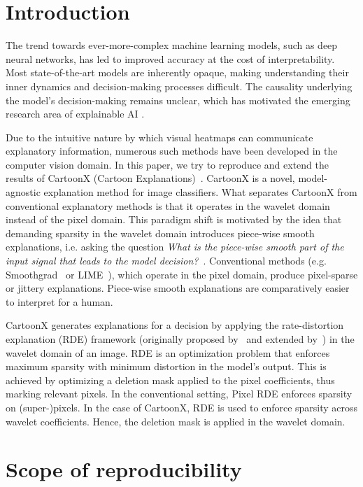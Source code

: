 
\section{Introduction}

The trend towards ever-more-complex machine learning models, such as deep neural networks, has led to improved accuracy at the cost of interpretability. Most state-of-the-art models are inherently opaque, making understanding their inner dynamics and decision-making processes difficult. The causality underlying the model's decision-making remains unclear, which has motivated the emerging research area of explainable AI \cite{das2020opportunities}.

Due to the intuitive nature by which visual heatmaps can communicate explanatory information, numerous such methods have been developed in the computer vision domain.
In this paper, we try to reproduce and extend the results of CartoonX (Cartoon Explanations)~\cite{cartoonX}.
CartoonX is a novel, model-agnostic explanation method for image classifiers.
What separates CartoonX from conventional explanatory methods is that it operates in the wavelet domain instead of the pixel domain.
This paradigm shift is motivated by the idea that demanding sparsity in the wavelet domain introduces piece-wise smooth explanations, i.e. asking the question \textit{What is the piece-wise smooth part of the input signal that leads to the model decision?}~\cite{cartoonX}.
Conventional methods (e.g. Smoothgrad~\cite{smilkov2017smoothgrad} or LIME~\cite{ribeiro2016lime}), which operate in the pixel domain, produce pixel-sparse or jittery explanations.
Piece-wise smooth explanations are comparatively easier to interpret for a human.

CartoonX generates explanations for a decision by applying the rate-distortion explanation (RDE) framework (originally proposed by~\cite{rdeOriginal} and extended by~\cite{rdeExtend}) in the wavelet domain of an image.
RDE is an optimization problem that enforces maximum sparsity with minimum distortion in the model's output.
This is achieved by optimizing a deletion mask applied to the pixel coefficients, thus marking relevant pixels.
In the conventional setting, Pixel RDE enforces sparsity on (super-)pixels.
In the case of CartoonX, RDE is used to enforce sparsity across wavelet coefficients.
Hence, the deletion mask is applied in the wavelet domain. 

\section{Scope of reproducibility}
\label{sec:claims}

